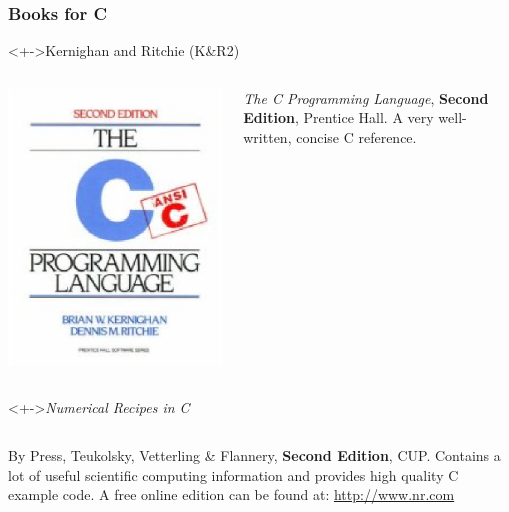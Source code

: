 \documentclass[table]{beamer}
\let\oldurl=\url
\renewcommand{\url}[1]{\textcolor{blue}{\oldurl{#1}}}
\begin{document}
\begin{frame}
\frametitle{Books for C}
\begin{block}<+->{Kernighan and Ritchie (K\&R2)}
\begin{columns}
\begin{column}{1.5cm}
\includegraphics[width=\textwidth]{kandr}
\end{column}
\begin{column}{8cm}
\emph{The C Programming Language}, {\bf Second Edition},
Prentice Hall. A very well-written, concise C reference.
\end{column}
\end{columns}
\end{block}

\begin{block}<+->{\emph{Numerical Recipes in C}}
\begin{columns}
\begin{column}{8cm}
By Press, Teukolsky, Vetterling \& Flannery, {\bf Second Edition}, CUP.
Contains a lot of useful scientific computing information and provides 
high quality C example code. A free online edition can be found at:
\url{http://www.nr.com}
\end{column}
\end{columns}
\end{block}
\end{frame}
\end{document}

